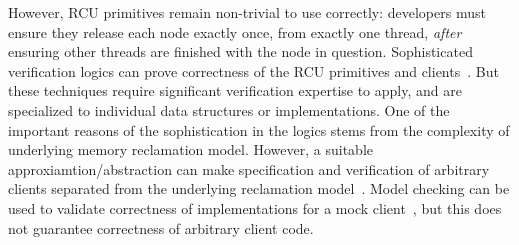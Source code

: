 However, RCU primitives remain non-trivial to use correctly: developers must ensure they release each node exactly once, from exactly one thread, \emph{after} ensuring other threads are finished with the node in question.
Sophisticated verification logics can prove correctness of the RCU primitives and clients~\cite{Gotsman:2013:VCM:2450268.2450289,fu2010reasoning,verrcu,Mandrykin:2016:TDV:3001219.3001297}.
But these techniques require significant verification expertise to apply, and are specialized to individual data structures or implementations.
One of the important reasons of the sophistication in the logics stems from the complexity of underlying memory reclamation model. However, a suitable approxiamtion/abstraction can make specification and verification of arbitrary clients separated from the underlying reclamation model~\cite{}.
Model checking can be used to validate correctness of implementations for a mock client~\cite{LiangMKM16,Desnoyers:2013:MSM:2506164.2506174,Kokologiannakis:2017:SMC:3092282.3092287,DBLP:conf/cav/AlglaveKT13}, but this does not guarantee correctness of arbitrary client code.

